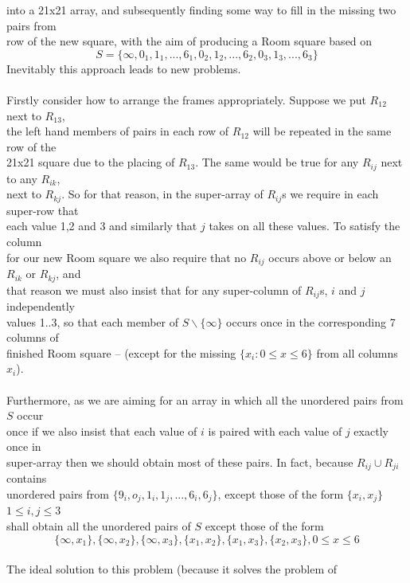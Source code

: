 \documentclass[
  12pt,
  a4paper]{book}
\begin{document}
into a 21x21 array, and subsequently finding some way to fill in the
missing two pairs from\\
row of the new square, with the aim of producing a Room square based on
\[S = \{\infty,0_1,1_1,...,6_1,0_2,1_2,...,6_2,0_3,1_3,...,6_3\}\]
Inevitably this approach leads to new problems.\\
~\\
Firstly consider how to arrange the frames appropriately. Suppose we put
\(R_{12}\) next to \(R_{13}\),\\
the left hand members of pairs in each row of \(R_{12}\) will be repeated
in the same row of the\\
21x21 square due to the placing of \(R_{13}\). The same would be true for
any \(R_{ij}\) next to any \(R_{ik}\),\\
next to \(R_{kj}\). So for that reason, in the super-array of \(R_{ij}\)s we
require in each super-row that\\
each value 1,2 and 3 and similarly that \(j\) takes on all these values.
To satisfy the column\\
for our new Room square we also require that no \(R_{ij}\) occurs above or
below an \(R_{ik}\) or \(R_{kj}\), and\\
that reason we must also insist that for any super-column of \(R_{ij}\)s,
\(i\) and \(j\) independently\\
values 1..3, so that each member of \(S \backslash \{\infty\}\) occurs
once in the corresponding 7 columns of\\
finished Room square -- (except for the missing
\(\{x_i: 0 \leq x \leq 6\}\) from all columns \(x_i\)).\\
~\\
Furthermore, as we are aiming for an array in which all the unordered
pairs from \(S\) occur\\
once if we also insist that each value of \(i\) is paired with each value
of \(j\) exactly once in\\
super-array then we should obtain most of these pairs. In fact, because
\(R_{ij} \cup R_{ji}\) contains\\
unordered pairs from \(\{9_i,o_j,1_i,1_j,...,6_i,6_j\}\), except those of
the form \(\{x_i,x_j\}\) \(1 \leq i,j \leq 3\)\\
shall obtain all the unordered pairs of \(S\) except those of the form
\[\{\infty,x_1\},\{\infty,x_2\},\{\infty,x_3\},\{x_1,x_2\},\{x_1,x_3\},\{x_2,x_3\}, 0 \leq x \leq 6\]\\
The ideal solution to this problem (because it solves the problem of
\end{document}
